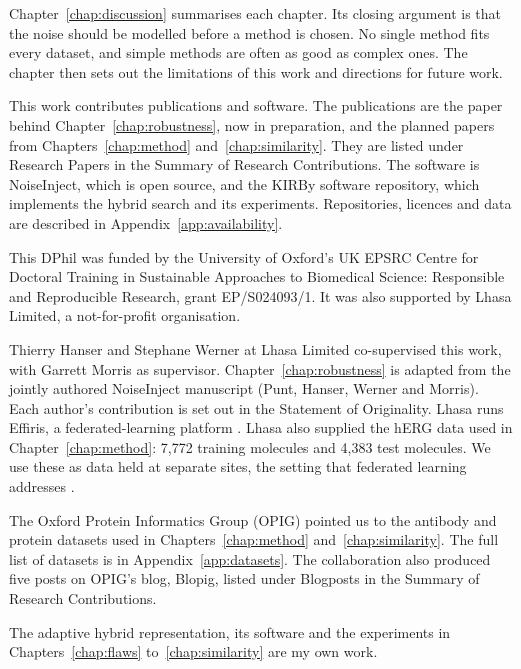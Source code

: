 Chapter~\ref{chap:discussion} summarises each chapter. Its closing argument is that the noise should be modelled before a method is chosen. No single method fits every dataset, and simple methods are often as good as complex ones. The chapter then sets out the limitations of this work and directions for future work.

This work contributes publications and software. The publications are the paper behind Chapter~\ref{chap:robustness}, now in preparation, and the planned papers from Chapters~\ref{chap:method} and~\ref{chap:similarity}. They are listed under Research Papers in the Summary of Research Contributions. The software is NoiseInject, which is open source, and the KIRBy software repository, which implements the hybrid search and its experiments. Repositories, licences and data are described in Appendix~\ref{app:availability}.

This DPhil was funded by the University of Oxford's UK EPSRC Centre for Doctoral Training in Sustainable Approaches to Biomedical Science: Responsible and Reproducible Research, grant EP/S024093/1. It was also supported by Lhasa Limited, a not-for-profit organisation.

Thierry Hanser and Stephane Werner at Lhasa Limited co-supervised this work, with Garrett Morris as supervisor. Chapter~\ref{chap:robustness} is adapted from the jointly authored NoiseInject manuscript (Punt, Hanser, Werner and Morris). Each author's contribution is set out in the Statement of Originality. Lhasa runs Effiris, a federated-learning platform \citep{Bassani2023}. Lhasa also supplied the hERG data used in Chapter~\ref{chap:method}: 7,772 training molecules and 4,383 test molecules. We use these as data held at separate sites, the setting that federated learning addresses \citep{Bassani2023, Hanser2023}.

The Oxford Protein Informatics Group (OPIG) pointed us to the antibody and protein datasets used in Chapters~\ref{chap:method} and~\ref{chap:similarity}. The full list of datasets is in Appendix~\ref{app:datasets}. The collaboration also produced five posts on OPIG's blog, Blopig, listed under Blogposts in the Summary of Research Contributions.

The adaptive hybrid representation, its software and the experiments in Chapters~\ref{chap:flaws} to~\ref{chap:similarity} are my own work.
